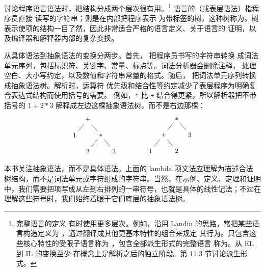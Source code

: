 讨论程序语言语法时，把结构分成两个层次很有用。\footnote{完整语言的定义
有时使用更多层次。例如，沿用 Landin 的思路，常把某些语言构造定义为
，通过翻译成其他更基本特性的组合来规定
其行为。只包含这些核心特性的受限子语言称为
，包含全部派生形式的完整语言
称为。从 EL 到 IL 的变换至少
在概念上是解析之后的独立阶段。第 11.3 节讨论派生形式。}
语言的（或表层语法）指程序员直接
读写的字符串；则是在内部把程序表示
为带标签的树，这种树称为。树表示使项的结构一目了然，因此非常适合严格的语言定义、关于语言的
证明，以及编译器和解释器内部的复杂变换。

从具体语法到抽象语法的变换分两步。首先，
把程序员书写的字符串转换
成词法单元序列，包括标识符、关键字、常量、标点等。词法分析器会删除注释，
处理空白、大小写约定，以及数值和字符串常量的格式。随后，
把词法单元序列转换成抽象语法树。解析时，运算符
优先级和结合性等约定减少了表层程序为明确复合表达式结构而使用括号的需要。
例如，\texttt{*} 比 \texttt{+} 结合得更紧，所以解析器把不带括号的
\(1+2*3\) 解释成左边这棵抽象语法树，而不是右边那棵：
\[
\begin{tikzpicture}[
  level distance=8mm,
  sibling distance=13mm,
  every node/.style={font=\small},
  baseline=(current bounding box.center)
]
\node {\(+\)}
 child {node {\(1\)}}
 child {node {\(*\)} child {node {\(2\)}} child {node {\(3\)}}};
\end{tikzpicture}
\qquad\qquad
\begin{tikzpicture}[
  level distance=8mm,
  sibling distance=13mm,
  every node/.style={font=\small},
  baseline=(current bounding box.center)
]
\node {\(*\)}
 child {node {\(+\)} child {node {\(1\)}} child {node {\(2\)}}}
 child {node {\(3\)}};
\end{tikzpicture}
\]

本书关注抽象语法，而不是具体语法。上面的 lambda 项文法应理解为描述合法
树结构，而不是词法单元或字符组成的字符串。当然，在示例、定义、定理和证明
中，我们需要把项写成从左到右排列的一串符号，也就是具体的线性记法；不过在
理解这些符号时，我们始终着眼于它们底层的抽象语法树。

